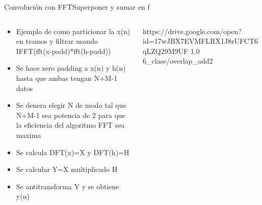 \begin{frame}[t]{Convolución con FFT}{Superponer y sumar en f}
   \begin{columns}[t]
      \footnotesize
      \begin{column}{.4\textwidth}
         \begin{itemize}
            \item{Ejemplo de como particionar la x(n) en tramos y filtrar usando IFFT(fft(x-padd)*fft(h-padd))}
            \item{Se hace zero padding a x(n) y  h(n) hasta que ambas tengan N+M-1 datos}
            \item{Se denera elegir N de modo tal que N+M-1 sea potencia de 2 para que la eficiencia del algoritmo FFT sea maxima}
            \item{Se calcula DFT(x)=X y DFT(h)=H}
            \item{Se calcular  Y=X multiplicado H}
            \item{Se antitransforma Y y se obtiene y(n)}
         \end{itemize}
      \end{column}
      \hspace{2pt}
      \vrule
      \hspace{2pt}
      \begin{column}{.6\textwidth}
         {https://drive.google.com/open?id=17wJBX7EVMFLRX1J8rUFCT6qLZQ29M9UF}
         {1.0}
         {6_clase/overlap_add2}
      \end{column}
      \hspace{2pt}
   \end{columns}
   \vfill
\end{frame}
